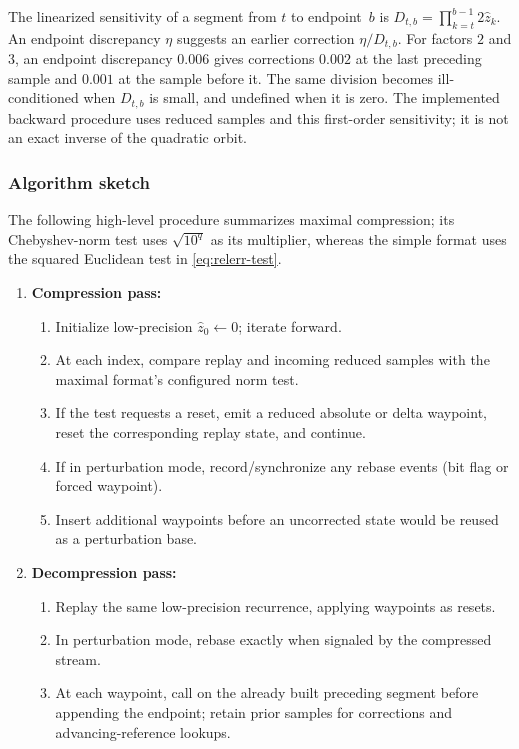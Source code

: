 The linearized sensitivity of a segment from $t$ to endpoint~$b$ is
$D_{t,b}=\prod_{k=t}^{b-1}2\hat z_k$.  An endpoint discrepancy $\eta$
suggests an earlier correction $\eta/D_{t,b}$.  For factors $2$ and $3$,
an endpoint discrepancy $0.006$ gives corrections $0.002$ at the last
preceding sample and $0.001$ at the sample before it.  The same division
becomes ill-conditioned when $D_{t,b}$ is small, and undefined when it is
zero.  The implemented backward procedure uses reduced samples and this
first-order sensitivity; it is not an exact inverse of the quadratic orbit.

\subsubsection{Algorithm sketch}

The following high-level procedure summarizes maximal compression; its
Chebyshev-norm test uses $\sqrt{10^q}$ as its multiplier, whereas the
simple format uses the squared Euclidean test in \eqref{eq:relerr-test}.

\begin{enumerate}
  \item \textbf{Compression pass:}
    \begin{enumerate}
      \item Initialize low-precision \(\hat z_0 \leftarrow 0\); iterate forward.
      \item At each index, compare replay and incoming reduced samples with the
            maximal format's configured norm test.
      \item If the test requests a reset, emit a reduced absolute or delta
            waypoint, reset the corresponding replay state, and continue.
      \item If in perturbation mode, record/synchronize any rebase events (bit flag or forced waypoint).
      \item Insert additional waypoints before an uncorrected state would be
            reused as a perturbation base.
    \end{enumerate}

  \item \textbf{Decompression pass:}
    \begin{enumerate}
      \item Replay the same low-precision recurrence, applying waypoints as resets.
      \item In perturbation mode, rebase exactly when signaled by the compressed stream.
      \item At each waypoint, call  on the already built
            preceding segment before appending the endpoint; retain prior samples
            for corrections and advancing-reference lookups.
    \end{enumerate}
\end{enumerate}

